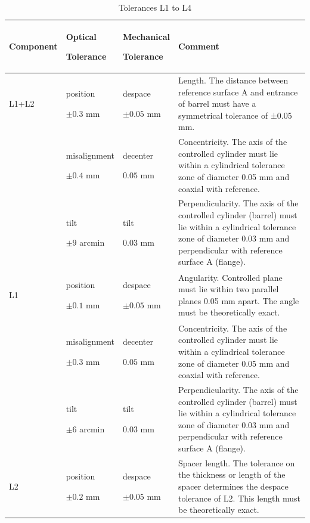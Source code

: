 \documentclass{report}
\begin{document}
\begin{table}
\caption{Tolerances L1 to L4}
\label{table:tolerances}
\begin{center}
\small
\begin{tabular}{lp{2cm}p{2cm}p{6cm}}
\hline
\hline
Component&Optical\par Tolerance&Mechanical\par Tolerance&Comment\\
\hline
L1+L2	
&position\par$\pm0.3$ mm &despace\par$\pm0.05$ mm&
Length. The distance between reference surface A and entrance of barrel must have a symmetrical tolerance of ±0.05 mm.\\
&misalignment\par$\pm0.4$ mm&decenter\par$0.05$ mm&							
Concentricity. The axis of the controlled cylinder must lie within a cylindrical tolerance zone of diameter 0.05 mm and coaxial with reference.\\
&tilt\par$\pm9$ arcmin&tilt\par$0.03$ mm&
Perpendicularity. The axis of the controlled cylinder (barrel) must lie within a cylindrical tolerance zone of diameter 0.03 mm and perpendicular with reference surface A (flange).\\
\hline
L1
&position\par$\pm0.1$ mm&despace\par$\pm0.05$ mm&
Angularity. Controlled plane must lie within two parallel planes 0.05 mm apart. The angle must be theoretically exact.\\	
&misalignment\par$\pm0.3$ mm&decenter\par$0.05$ mm&
Concentricity. The axis of the controlled cylinder must lie within a cylindrical tolerance zone of diameter 0.05 mm and coaxial with reference.\\
&tilt\par$\pm6$ arcmin&tilt\par0.03 mm&Perpendicularity. The axis of the controlled cylinder (barrel) must lie within a cylindrical tolerance zone of diameter 0.03 mm and perpendicular with reference surface A (flange).\\
\hline
L2
&position\par$\pm0.2$ mm&despace\par$\pm 0.05$ mm&
Spacer length. The tolerance on the thickness or length of the spacer determines the despace tolerance of L2. This length must be theoretically exact.\\

\end{tabular}
\end{center}
\end{table}
\end{document}
